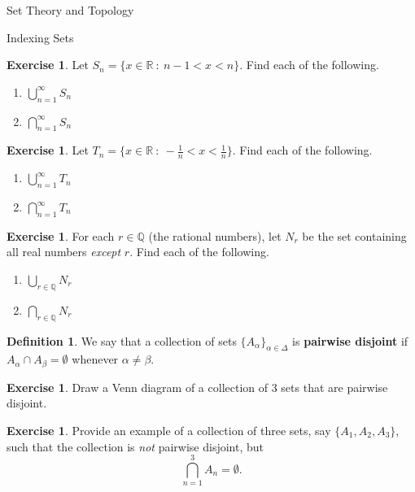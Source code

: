 \documentclass[11pt]{article}
\theoremstyle{definition}
\newtheorem{definition}[theorem]{Definition}
\newtheorem{exercise}[theorem]{Exercise}
\begin{document}
\begin{section}{Set Theory and Topology}
\begin{subsection}{Indexing Sets}
\begin{exercise}
Let $S_n = \{x \in \mathbb{R} \ : \ n-1<x<n \}$.  Find each of the following.
\begin{enumerate}
\item $\displaystyle \bigcup_{n=1}^{\infty}S_n$

\item $\displaystyle \bigcap_{n=1}^{\infty}S_n$
\end{enumerate}
\end{exercise}

\begin{exercise}
Let $T_n = \{x \in \mathbb{R} \ : \ -\frac{1}{n}<x< \frac{1}{n} \}$.  Find each of the following.
\begin{enumerate}
\item $\displaystyle \bigcup_{n=1}^{\infty}T_n$

\item $\displaystyle \bigcap_{n=1}^{\infty}T_n$
\end{enumerate}

\end{exercise}

\begin{exercise}
For each $r\in\mathbb{Q}$ (the rational numbers), let $N_r$ be the set containing all real numbers \emph{except} $r$.  Find each of the following.
\begin{enumerate}
\item $\displaystyle \bigcup_{r\in\mathbb{Q}}N_r$

\item $\displaystyle \bigcap_{r\in\mathbb{Q}}N_r$
\end{enumerate}

\end{exercise}

\begin{definition}
We say that a collection of sets $\{A_{\alpha}\}_{\alpha\in\Delta}$ is \textbf{pairwise disjoint} if $A_{\alpha} \cap A_{\beta}=\emptyset$ whenever $\alpha\neq \beta$.
\end{definition}

\begin{exercise}
Draw a Venn diagram of a collection of 3 sets that are pairwise disjoint.
\end{exercise}

\begin{exercise}
Provide an example of a collection of three sets, say $\{A_1, A_2, A_3\}$, such that the collection is \emph{not} pairwise disjoint, but 
\[
\bigcap_{n=1}^3 A_n=\emptyset.
\]
\end{exercise}


\end{subsection}
\end{section}
\end{document}

